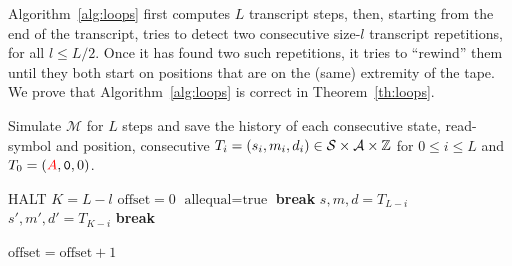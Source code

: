 Algorithm~\ref{alg:loops} first computes $L$ transcript steps, then, starting from the end of the transcript, tries to detect two consecutive size-$l$ transcript repetitions, for all $l \leq L/2$. Once it has found two such repetitions, it tries to ``rewind'' them until they both start on positions that are on the (same) extremity of the tape. We prove that Algorithm~\ref{alg:loops} is correct in Theorem~\ref{th:loops}.




\begin{algorithm}
    \caption{{\sc decider-Loops}, reformulates the algorithm \texttt{loop1\_decider} of Coq-BB5.}\label{alg:loops}

    \begin{algorithmic}[1]

        \State
        \State Simulate $\mathcal{M}$ for $L$ steps and save the history of each consecutive state, read-symbol and position, \ie consecutive $T_i = (s_i,m_i,d_i)\in\mathcal{S}\times\mathcal{A}\times\mathbb{Z}$ for $0 \leq i \leq L$ and $T_0 = (\stateA,\symbolzero,0)$.


        \State {}
        \State \Return HALT \label{alg:loops:halt}
        \EndIf
        \State {} 
        \State $K = L-l$
        \State $\text{offset} = 0$ 
        \State $\text{allequal} = \text{true}$
        \State \For{$i$ \textbf{in} $[0,l+\text{offset}[$ }
        \State \textbf{break}
        \State \EndIf
        \State $s,m,d = T_{L-i}$
        \State $s',m',d' = T_{K-i}$
        \State
        \label{alg:loops:testeq} 
        \State \textbf{break}
        \EndIf

        \State {}
        \label{alg:loops:cycler}
        \State \Return \NONHALT {}
        \EndIf
        \State {}\label{alg:loops:tcplus}
        \State \Return \NONHALT {}
        \EndIf
        \State {}\label{alg:loops:tcminus}
        \State \Return \NONHALT {}
        \State \EndIf
        \State $\text{offset} = \text{offset} + 1$
        \State \EndIf
        \EndFor
        \EndFor

        \State \Return \UNKNOWN

    \end{algorithmic}

\end{algorithm}


